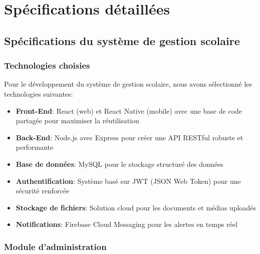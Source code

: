 \section{Spécifications détaillées}

\subsection{Spécifications du système de gestion scolaire}

\subsubsection{Technologies choisies}

Pour le développement du système de gestion scolaire, nous avons sélectionné les technologies suivantes:

\begin{itemize}
  \item \textbf{Front-End}: React (web) et React Native (mobile) avec une base de code partagée pour maximiser la réutilisation
  
  \item \textbf{Back-End}: Node.js avec Express pour créer une API RESTful robuste et performante
  
  \item \textbf{Base de données}: MySQL pour le stockage structuré des données
  
  \item \textbf{Authentification}: Système basé sur JWT (JSON Web Token) pour une sécurité renforcée
  
  \item \textbf{Stockage de fichiers}: Solution cloud pour les documents et médias uploadés
  
  \item \textbf{Notifications}: Firebase Cloud Messaging pour les alertes en temps réel
\end{itemize}

\subsubsection{Module d'administration}

